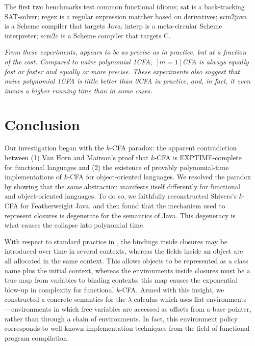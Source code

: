 The first two benchmarks test common functional idioms;
\textsf{sat} is a back-tracking SAT-solver;
\textsf{regex} is a regular expression matcher based on derivatives;
\textsf{scm2java} is a Scheme compiler that targets Java;
\textsf{interp} is a meta-circular Scheme interpreter;
\textsf{scm2c} is a Scheme compiler that targets C.

\emph{From these experiments, \nCFA{} appears to be as precise as \kCFA{} in
practice, but at a fraction of the cost. Compared to naive polynomial 1CFA, 
$[m=1]$CFA is always equally fast or faster and equally or
more precise.
These experiments also suggest that naive polynomial 1CFA is little better
than 0CFA in practice, and, in fact, it even incurs a higher running
time than \kCFA{} in some cases.}








\section{Conclusion}
\label{sec:conclusion}

Our investigation began with the $k$-CFA paradox: the apparent
contradiction between (1) Van Horn and Mairson's proof that $k$-CFA is
EXPTIME-complete for functional languages and (2) the existence of
provably polynomial-time implementations of $k$-CFA for
object-oriented languages.
We resolved the paradox by showing that the \emph{same} abstraction
manifests itself differently for functional and object-oriented
languages.
To do so, we faithfully reconstructed Shivers's $k$-CFA for
Featherweight Java, and then found that the mechanism used to
represent closures is degenerate for the semantics of Java.
This degeneracy is what causes the collapse into polynomial time.

With respect to standard practice in \kCFA{}, the bindings inside
closures may be introduced over time in several contexts, whereas the
fields inside an object are all allocated in the same context.
This allows objects to be represented as a class name plus the initial
context, whereas the environments inside closures must be a true map from
variables to binding contexts; this map causes the exponential blow-up
in complexity for functional $k$-CFA.
Armed with this insight, we constructed a concrete semantics for the
$\lambda$-calculus which uses flat environments---environments in
which free variables are accessed as offsets from a base pointer,
rather than through a chain of environments.
In fact, this environment policy corresponds to well-known
implementation techniques from the field of functional program
compilation.

